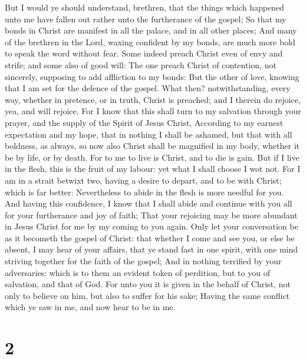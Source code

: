  But I would ye should understand, brethren, that the
things which happened unto me have fallen out rather unto the
furtherance of the gospel;  So that my bonds in Christ are
manifest in all the palace, and in all other places;  And
many of the brethren in the Lord, waxing confident by my bonds, are much
more bold to speak the word without fear.  Some indeed
preach Christ even of envy and strife; and some also of good will:
 The one preach Christ of contention, not sincerely,
supposing to add affliction to my bonds:  But the other of
love, knowing that I am set for the defence of the gospel. 
What then? notwithstanding, every way, whether in pretence, or in truth,
Christ is preached; and I therein do rejoice, yea, and will rejoice.
 For I know that this shall turn to my salvation through
your prayer, and the supply of the Spirit of Jesus Christ, 
According to my earnest expectation and my hope, that in nothing I shall
be ashamed, but that with all boldness, as always, so now also Christ
shall be magnified in my body, whether it be by life, or by death.
 For to me to live is Christ, and to die is gain.
 But if I live in the flesh, this is the fruit of my
labour: yet what I shall choose I wot not.  For I am in a
strait betwixt two, having a desire to depart, and to be with Christ;
which is far better:  Nevertheless to abide in the flesh is
more needful for you.  And having this confidence, I know
that I shall abide and continue with you all for your furtherance and
joy of faith;  That your rejoicing may be more abundant in
Jesus Christ for me by my coming to you again.  Only let
your conversation be as it becometh the gospel of Christ: that whether I
come and see you, or else be absent, I may hear of your affairs, that ye
stand fast in one spirit, with one mind striving together for the faith
of the gospel;  And in nothing terrified by your
adversaries: which is to them an evident token of perdition, but to you
of salvation, and that of God.  For unto you it is given in
the behalf of Christ, not only to believe on him, but also to suffer for
his sake;  Having the same conflict which ye saw in me, and
now hear to be in me.

\hypertarget{section-1}{%
\section{2}\label{section-1}}


